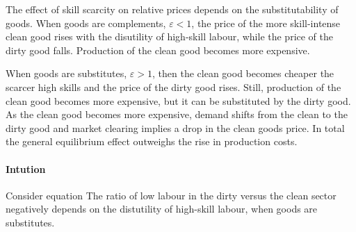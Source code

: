 \begin{prop} 
	
	The effect of skill scarcity on relative prices depends on the substitutability of goods. When goods are complements, $\varepsilon<1$, the price of the more skill-intense clean good rises with the disutility of high-skill labour, while the price of the dirty good falls.
	Production of the clean good becomes more expensive. 
	
	When goods are substitutes, $\varepsilon>1$, then the clean good becomes cheaper the scarcer high skills and the price of the dirty good rises. Still, production of the clean good becomes more expensive, but it can be substituted by the dirty good. As the clean good becomes more expensive, demand shifts from the clean to the dirty good and market clearing implies a drop in the clean goods price. In total the general equilibrium effect outweighs the rise in production costs. 
\end{prop}

\paragraph{Intution}
Consider equation
The ratio of low labour in the dirty versus the clean sector negatively depends on the distutility of high-skill labour, when goods are substitutes.

